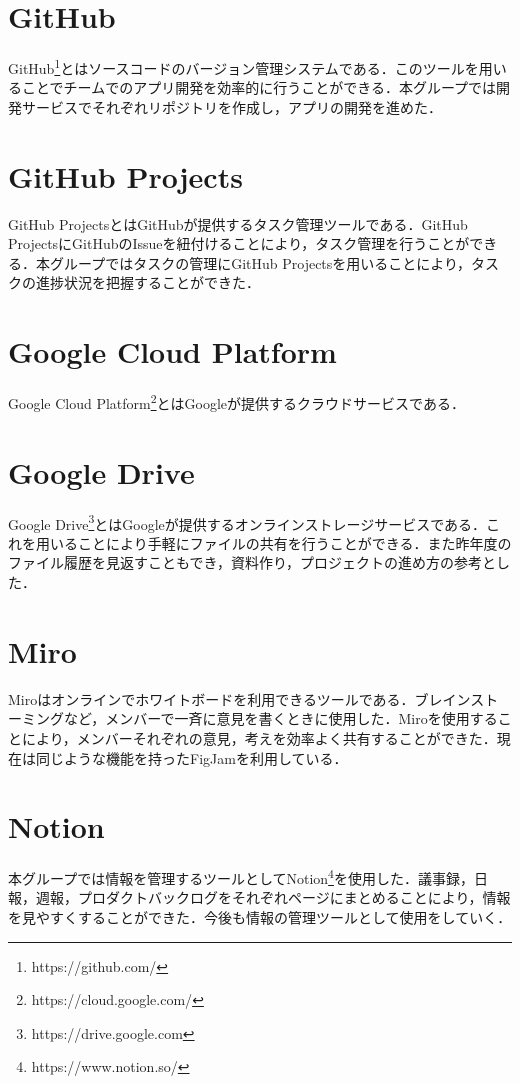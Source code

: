\section{GitHub}
GitHub\footnote{https://github.com/}とはソースコードのバージョン管理システムである．このツールを用いることでチームでのアプリ開発を効率的に行うことができる．本グループでは開発サービスでそれぞれリポジトリを作成し，アプリの開発を進めた．

\section{GitHub Projects}
GitHub ProjectsとはGitHubが提供するタスク管理ツールである．GitHub ProjectsにGitHubのIssueを紐付けることにより，タスク管理を行うことができる．本グループではタスクの管理にGitHub Projectsを用いることにより，タスクの進捗状況を把握することができた．

\section{Google Cloud Platform}
Google Cloud Platform\footnote{https://cloud.google.com/}とはGoogleが提供するクラウドサービスである．

\section{Google Drive}
Google Drive\footnote{https://drive.google.com}とはGoogleが提供するオンラインストレージサービスである．これを用いることにより手軽にファイルの共有を行うことができる．また昨年度のファイル履歴を見返すこともでき，資料作り，プロジェクトの進め方の参考とした．

\section{Miro}
Miroはオンラインでホワイトボードを利用できるツールである．ブレインストーミングなど，メンバーで一斉に意見を書くときに使用した．Miroを使用することにより，メンバーそれぞれの意見，考えを効率よく共有することができた．現在は同じような機能を持ったFigJamを利用している．

\section{Notion}
本グループでは情報を管理するツールとしてNotion\footnote{https://www.notion.so/}を使用した．議事録，日報，週報，プロダクトバックログをそれぞれページにまとめることにより，情報を見やすくすることができた．今後も情報の管理ツールとして使用をしていく．

